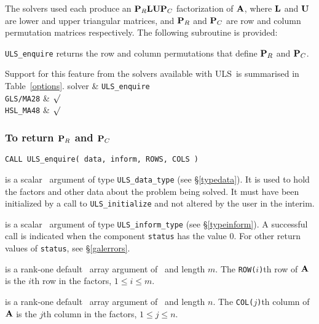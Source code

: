 \documentclass{galahad}
\newcommand{\packagename}{ULS}
\begin{document}
The solvers used each produce an ${\mathbf{P}}_R {\mathbf{L}} {\mathbf{U}} {\mathbf{P}}_C$ factorization 
of ${\mathbf{A}}$, where ${\mathbf{L}}$ and ${\mathbf{U}}$ are lower and upper triangular 
matrices, and ${\mathbf{P}}_R$ and ${\mathbf{P}}_C$ are row and column permutation
matrices respectively.
The following subroutine is provided: 
\begin{description} 
\ittf{} {\tt \packagename\_enquire} returns the row and column permutations
that define ${\mathbf{P}}_R$ and ${\mathbf{P}}_C$.
 
 
\end{description} 
Support for this feature from the solvers available with \packagename\
is summarised in Table~\ref{options}.
\hline
 solver & {\tt \packagename\_enquire} \\
\hline
{\tt GLS/MA28}  & $\surd$  \\
{\tt HSL\_MA48} & $\surd$  \\
\hline 
{}
\vspace*{-8mm} 
\subsubsection{To return ${\mathbf{P}}_R$ and ${\mathbf{P}}_C$}
\label{galenquire}
 
\hskip0.5in 
{\tt CALL \packagename\_enquire( data, inform, ROWS, COLS )}
 
\begin{description} 

 is a scalar \intentinout\ argument of type 
{\tt \packagename\_data\_type}
(see \S\ref{typedata}). It is used to hold the factors and other 
data about the problem being solved. 
It must have been initialized by a call to
{\tt \packagename\_ini\-tialize} and not altered by the user in the interim.

 is a scalar \intentinout\ argument of type 
{\tt \packagename\_inform\_type}
(see \S\ref{typeinform}). 
A successful call is indicated when the  component {\tt status} has the value 0. 
For other return values of {\tt status}, see \S\ref{galerrors}.
 
 is a rank-one default \integer\ array argument 
of \intentout\  and length $m$. The {\tt ROW($i$)}th row of ${\mathbf{A}}$
is the $i$th row in the factors, $1 \leq i \leq m$.

 is a rank-one default \integer\ array argument 
of \intentout\  and length $n$. The {\tt COL($j$)}th column of ${\mathbf{A}}$
is the $j$th column in the factors, $1 \leq j \leq n$.
\end{description} 
 
\end{document}
